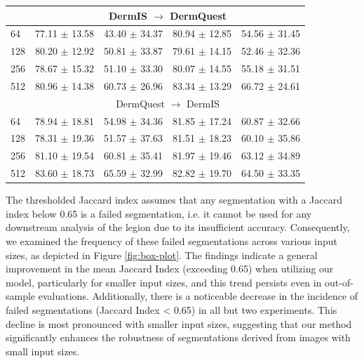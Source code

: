 \begin{table}[h]
\begin{tabularx}{\textwidth}{X|cc|cc}
\midrule
 &\multicolumn{4}{c}{DermIS $\rightarrow$ DermQuest} \\
\midrule
 64                                                       & 77.11 $\pm$ 13.58 & 43.40 $\pm$ 34.37 & 80.94 $\pm$ 12.85 & 54.56 $\pm$ 31.45 \\
 128                                                      & 80.20 $\pm$ 12.92 & 50.81 $\pm$ 33.87 & 79.61 $\pm$ 14.15 & 52.46 $\pm$ 32.36 \\
 256                                                      & 78.67 $\pm$ 15.32 & 51.10 $\pm$ 33.30 & 80.07 $\pm$ 14.55 & 55.18 $\pm$ 31.51 \\
 512                                                      & 80.96 $\pm$ 14.38 & 60.73 $\pm$ 26.96 & 83.34 $\pm$ 13.29 & 66.72 $\pm$ 24.61 \\
\midrule
 &\multicolumn{4}{c}{DermQuest $\rightarrow$ DermIS} \\
\midrule
 64                                                       & 78.94 $\pm$ 18.81 & 54.98 $\pm$ 34.36 & 81.85 $\pm$ 17.24 & 60.87 $\pm$ 32.66 \\
 128                                                      & 78.31 $\pm$ 19.36 & 51.57 $\pm$ 37.63 & 81.51 $\pm$ 18.23 & 60.10 $\pm$ 35.86 \\
 256                                                      & 81.10 $\pm$ 19.54 & 60.81 $\pm$ 35.41 & 81.97 $\pm$ 19.46 & 63.12 $\pm$ 34.89 \\
 512                                                      & 83.60 $\pm$ 18.73 & 65.59 $\pm$ 32.99 & 82.82 $\pm$ 19.70 & 64.50 $\pm$ 33.35 \\
\end{tabularx}
\end{table}

The thresholded Jaccard index assumes that any segmentation with a Jaccard index below 0.65 is a failed segmentation, i.e. it cannot be used for any downstream analysis of the legion due to its insufficient accuracy. Consequently, we examined the frequency of these failed segmentations across various input sizes, as depicted in Figure \ref{fig:box-plot}. The findings indicate a general improvement in the mean Jaccard Index (exceeding 0.65) when utilizing our model, particularly for smaller input sizes, and this trend persists even in out-of-sample evaluations. Additionally, there is a noticeable decrease in the incidence of failed segmentations (Jaccard Index < 0.65) in all but two experiments. This decline is most pronounced with smaller input sizes, suggesting that our method significantly enhances the robustness of segmentations derived from images with small input sizes.


